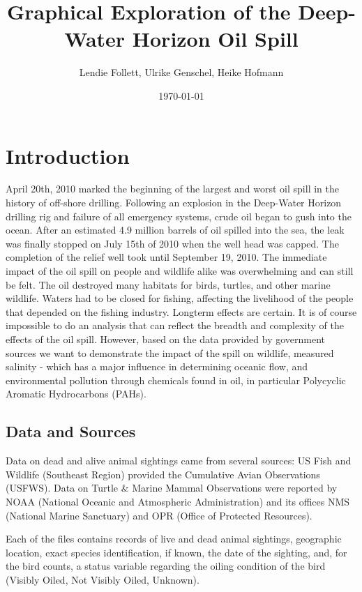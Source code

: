 \documentclass[authoryear,12pt]{elsarticle}
\title{Graphical Exploration of the Deep-Water Horizon Oil Spill}
\author{Lendie Follett, Ulrike Genschel, Heike Hofmann}
\date{\today}                                           %
\begin{document}
\maketitle
\begin{abstract}
\end{abstract}
\section{Introduction}
April 20th, 2010 marked the beginning of the largest and worst oil spill in the history of off-shore drilling.  Following an explosion in the Deep-Water Horizon drilling rig and failure of all emergency systems, crude oil began to gush into the ocean.  After an estimated 4.9 million barrels of oil spilled into the sea, the leak was finally stopped on July 15th of 2010 when the well head was capped.  The completion of the relief well took until September 19, 2010.  The immediate impact of the oil spill on people and wildlife alike was overwhelming and can still be felt.  The oil destroyed many habitats for birds, turtles, and other marine wildlife.  Waters had to be closed for fishing, affecting the livelihood of the people that depended on the fishing industry. Longterm effects are certain. It is of course impossible to do an analysis that can reflect the breadth and complexity of the effects of the oil spill.  However, based on the data provided by government sources we want to demonstrate the impact of the spill on wildlife, measured salinity - which has a major influence in determining oceanic flow, and environmental pollution through chemicals found in oil, in particular Polycyclic Aromatic Hydrocarbons (PAHs). 

\subsection{Data and Sources}
Data on dead and alive animal sightings came from several sources: US Fish and Wildlife (Southeast Region) provided the Cumulative Avian Observations (USFWS).
Data on Turtle \& Marine Mammal Observations were reported by NOAA (National Oceanic and Atmospheric Administration) and its offices NMS (National Marine Sanctuary) and OPR (Office of Protected Resources). 

Each of the files contains records of live and dead animal sightings, geographic location, exact species identification, if known, the date of the sighting, and, for the bird counts, a status variable regarding the oiling condition of the bird (Visibly Oiled, Not Visibly Oiled, Unknown). 
\end{document}
